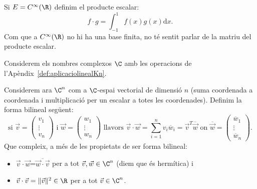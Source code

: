 \begin{exemple}
Si $E=C^\infty(\R)$ definim el producte escalar:
\[
f\cdot g = \int_{-1}^1 f(x)g(x)\mathrm{d}x .
\]
Com que a $C^\infty(\R)$ no hi ha una base finita, no té sentit parlar de la matriu del producte escalar.
\end{exemple}

\begin{exemple}\label{exemple:complexos}
Considerem els nombres complexos $\C$ amb les operacions de l'Apèndix~\ref{def:aplicaciolinealKn}.

Considerem ara $\C^n$ com a $\C$-espai vectorial de dimensió $n$ (suma coordenada a coordenada i multiplicació per un escalar a totes les coordenades). Definim la forma bilineal següent:
\[
\text{si }
\vec v=\begin{pmatrix}
v_1 \\ \vdots \\ v_n
\end{pmatrix}
\text{ i }
\vec w=\begin{pmatrix}
w_1 \\ \vdots \\ w_n
\end{pmatrix}
\text{ llavors }
\vec v\cdot \vec w= \sum_{i=1}^n v_i\overline{w}_i=\vec v^T \overline{\vec w} \text{ on }
\overline{\vec w}=\begin{pmatrix}
\overline w_1 \\ \vdots \\ \overline w_n
\end{pmatrix}.
\]
Que compleix, a més de les propietats de ser forma bilineal:
\begin{itemize}
    \item $\vec v\cdot \vec w$=$\overline{\vec w\cdot \vec v}$ per a tot $\vec v,\vec w\in \C^n$ (diem que és hermítica) i
    \item $\vec v\cdot \vec v=\|\vec v\|^2\in \R$ per a tot $\vec v\in\C^n$.
\end{itemize}
\end{exemple}

